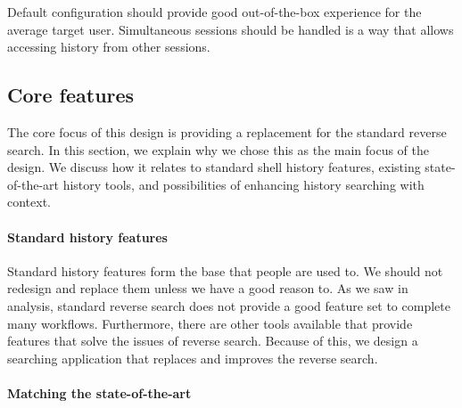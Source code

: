 \documentclass[thesis=M,english]{FITthesis}[2012/10/20]
\begin{document}
Default configuration should provide good out-of-the-box experience for the average target user. 
Simultaneous sessions should be handled is a way that allows accessing history from other sessions.


\subsection{Core features}

The core focus of this design is providing a replacement for the standard reverse search. In this section, we explain why we chose this as the main focus of the design. We discuss how it relates to standard shell history features, existing state-of-the-art history tools, and possibilities of enhancing history searching with context.




\paragraph{Standard history features}

Standard history features form the base that people are used to. We should not redesign and replace them unless we have a good reason to.
As we saw in analysis, standard reverse search does not provide a good feature set to complete many workflows. Furthermore, there are other tools available that provide features that solve the issues of reverse search. Because of this, we design a searching application that replaces and improves the reverse search.



\paragraph{Matching the state-of-the-art}
\end{document}
